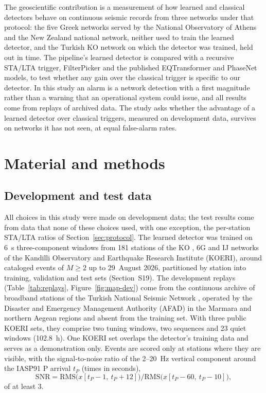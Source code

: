 \documentclass[a4paper,fleqn]{cas-sc}
\newcommand{\stalta}{STA/LTA}
\begin{document}
The geoscientific contribution is a measurement of how learned and classical
detectors behave on continuous seismic records from three networks under that
protocol: the five Greek networks served by the National Observatory of
Athens and the New Zealand national network, neither used to train the learned
detector, and the
Turkish KO network on which the detector was trained, held out in time. The
pipeline's learned detector is compared with a recursive \stalta{} trigger,
FilterPicker \citep{lomax2012} and the published EQTransformer
\citep{mousavi2020eqt} and PhaseNet \citep{zhu2019} models, to test whether any gain
over the classical trigger is specific to our detector. In this study an alarm is a network detection with a first magnitude rather
than a warning that an operational system could issue, and all results come from
replays of archived data. The study asks whether the advantage of a learned detector
over classical triggers, measured on development data, survives on networks it has
not seen, at equal false-alarm rates.

\section{Material and methods}\label{sec:methods}

\subsection{Development and test data}\label{sec:data}

All choices in this study were made on development data; the test results come from
data that none of these choices used, with one exception, the per-station \stalta{}
ratios of Section~\ref{sec:protocol}. The learned detector was trained on 6~s
three-component windows from 181 stations of the KO \citep{koeri1971}, 6G
\citep{koeri2013marsite} and IJ \citep{iu2013} networks of the Kandilli Observatory
and Earthquake Research Institute (KOERI), around cataloged events of $M \geq 2$ up
to 29~August 2026, partitioned by station into training, validation and test sets
(Section~S19). The development
replays (Table~\ref{tab:replays}, Figure~\ref{fig:map-dev}) come from the continuous
archive of broadband stations of the Turkish National Seismic Network
\citep[TU;][]{afad1990}, operated by the Disaster and Emergency Management Authority
(AFAD) in the Marmara and northern Aegean regions and absent from the training set.
With three public KOERI sets, they comprise two tuning windows, two sequences and 23
quiet windows (102.8~h). One KOERI set overlaps the detector's training data and
serves as a demonstration only.
Events are scored only at stations where they are visible, with the signal-to-noise
ratio of the 2--20~Hz vertical component around the IASP91 P arrival $t_P$ (times in
seconds),
\begin{equation}\label{eq:snr}
  \mathrm{SNR} = \mathrm{RMS}\bigl(x[t_P - 1,\ t_P + 12]\bigr)/
  \mathrm{RMS}\bigl(x[t_P - 60,\ t_P - 10]\bigr),
\end{equation}
of at least 3.
\end{document}
